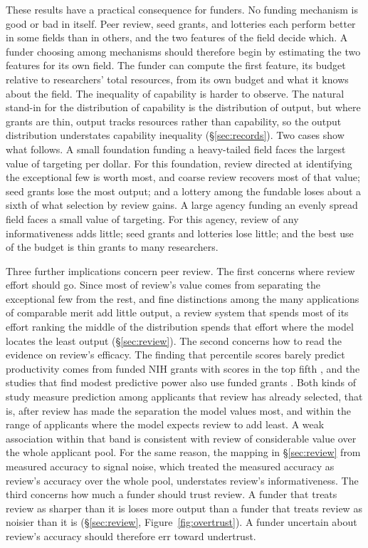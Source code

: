 \documentclass[article, 11pt, reqno]{amsart}
\theoremstyle{named}
\begin{document}
These results have a practical consequence for funders. No funding mechanism is good or bad in itself. Peer review, seed grants, and lotteries each perform better in some fields than in others, and the two features of the field decide which. A funder choosing among mechanisms should therefore begin by estimating the two features for its own field. The funder can compute the first feature, its budget relative to researchers' total resources, from its own budget and what it knows about the field. The inequality of capability is harder to observe. The natural stand-in for the distribution of capability is the distribution of output, but where grants are thin, output tracks resources rather than capability, so the output distribution understates capability inequality (\S\ref{sec:records}). Two cases show what follows. A small foundation funding a heavy-tailed field faces the largest value of targeting per dollar. For this foundation, review directed at identifying the exceptional few is worth most, and coarse review recovers most of that value; seed grants lose the most output; and a lottery among the fundable loses about a sixth of what selection by review gains. A large agency funding an evenly spread field faces a small value of targeting. For this agency, review of any informativeness adds little; seed grants and lotteries lose little; and the best use of the budget is thin grants to many researchers.

Three further implications concern peer review. The first concerns where review effort should go. Since most of review's value comes from separating the exceptional few from the rest, and fine distinctions among the many applications of comparable merit add little output, a review system that spends most of its effort ranking the middle of the distribution spends that effort where the model locates the least output (\S\ref{sec:review}). The second concerns how to read the evidence on review's efficacy. The finding that percentile scores barely predict productivity comes from funded NIH grants with scores in the top fifth \citep{Fang2016}, and the studies that find modest predictive power also use funded grants \citep{LiAgha2015}. Both kinds of study measure prediction among applicants that review has already selected, that is, after review has made the separation the model values most, and within the range of applicants where the model expects review to add least. A weak association within that band is consistent with review of considerable value over the whole applicant pool. For the same reason, the mapping in \S\ref{sec:review} from measured accuracy to signal noise, which treated the measured accuracy as review's accuracy over the whole pool, understates review's informativeness. The third concerns how much a funder should trust review. A funder that treats review as sharper than it is loses more output than a funder that treats review as noisier than it is (\S\ref{sec:review}, Figure~\ref{fig:overtrust}). A funder uncertain about review's accuracy should therefore err toward undertrust.
\end{document}
